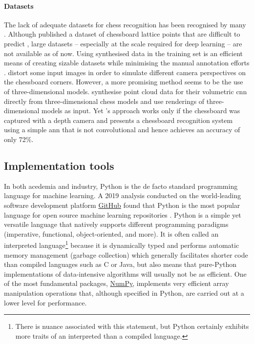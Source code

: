 \paragraph{Datasets}
The lack of adequate datasets for chess recognition has been recognised by many \cite{czyzewski2020,ding2016,mehta2020}.
Although \textcite{czyzewski2020} published a dataset of chessboard lattice points that are difficult to predict \cite{czyzewski2018}, large datasets -- especially at the scale required for deep learning -- are not available as of now.
Using synthesised data in the training set is an efficient means of creating sizable datasets while minimising the manual annotation efforts \cite{wei2017,hou,czyzewski2020}.
\citeauthor{czyzewski2020} distort some input images in order to simulate different camera perspectives on the chessboard corners.
However, a more promising method seems to be the use of three-dimensional models.
\textcite{wei2017} synthesise point cloud data for their volumetric \gls{cnn} directly from three-dimensional chess models and \textcite{hou} use renderings of three-dimensional models as input. 
Yet \textcite{wei2017}'s approach works only if the chessboard was captured with a depth camera and \textcite{hou} presents a chessboard recognition system using a simple \gls{ann} that is not convolutional and hence achieves an accuracy of only 72\%.

\subsection{Implementation tools}
\label{sec:implementation_tools}
In both acedemia and industry, Python is the de facto standard programming language for machine learning. 
A 2019 analysis conducted on the world-leading software development platform \href{https://www.github.com/}{GitHub} found that Python is the most popular language for open source machine learning repositories \cite{elliott2019}.
Python is a simple yet versatile language that natively supports different programming paradigms (imperative, functional, object-oriented, and more).
It is often called an interpreted language\footnote{There is nuance associated with this statement, but Python certainly exhibits more traits of an interpreted than a compiled language.} because it is dynamically typed and performs automatic memory management (garbage collection) which generally facilitates shorter code than compiled languages such as C or Java, but also means that pure-Python implementations of data-intensive algorithms will usually not be as efficient.
One of the most fundamental packages, \href{https://numpy.org/}{NumPy}, implements very efficient array manipulation operations that, although specified in Python, are carried out at a lower level for performance.

